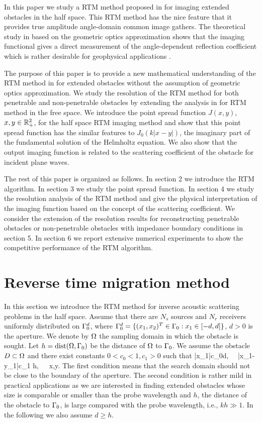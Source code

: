 \documentclass[11pt]{iopart}
\begin{document}
In this paper we study a RTM method proposed in \cite{zs09, zs07} for imaging extended obstacles in the half space. This RTM method has the nice feature that it provides true amplitude angle-domain common image gathers. The theoretical study in \cite{zs07} based on the geometric optics approximation shows that the imaging functional gives a direct measurement of the angle-dependent reflection coefficient which is rather desirable for geophysical applications \cite{bcs}.

The purpose of this paper is to provide a new mathematical understanding of the RTM method in \cite{zs09, zs07} for extended obstacles without the assumption of geometric optics approximation. We study the resolution of the RTM method for both penetrable and non-penetrable obstacles by extending the analysis in \cite{cch_a, cch_e} for RTM method in the free space. We introduce the point spread function $J(x,y)$, $x,y\in{\mathbb{R}}^2_+$, for the half space RTM imaging method and show that this point spread function has the similar features to $J_0(k|x-y|)$, the imaginary part of the fundamental solution of the Helmholtz equation. We also show that the output imaging function is related to the scattering coefficient of the obstacle for incident plane waves.

The rest of this paper is organized as follows. In section 2 we introduce the RTM algorithm. In section 3 we study the point spread function. In section 4 we study the resolution analysis of the RTM method and give the physical interpretation of the imaging function based on the concept of the scattering coefficient. We consider the extension of the resolution results for reconstructing penetrable
obstacles or non-penetrable obstacles with impedance boundary conditions in section 5.  In section 6 we report extensive numerical experiments to show the competitive performance of the RTM algorithm.

\section{Reverse time migration method}{\label{section2}}

In this section we introduce the RTM method for inverse acoustic scattering problems
in the half space. Assume that there are $N_s$ sources and $N_r$ receivers uniformly distributed on $\Gamma_0^d$, where $\Gamma_0^d=\{(x_1,x_2)^T\in\Gamma_0: x_1\in [-d,d]\}$, $d>0$ is the aperture. We denote by $\Omega$ the sampling domain in which the obstacle is sought. Let $h=\mathrm{dist}(\Omega,\Gamma_0)$ be the distance of $\Omega$ to $\Gamma_0$.
We assume the obstacle $D \subset\Omega$ and there exist constants $0<c_0<1, c_1>0$ such that
\bee\label{cond}
\qquad |x_1|\le c_0d, \ \ |x_1-y_1|\le c_1 h,\ \ \ \forall x,y\in\Om.
\eee
The first condition means that the search domain should not be close to the boundary of the aperture. The second condition is rather mild in practical applications as we are interested in finding extended obstacles
whose size is comparable or smaller than the probe wavelength and $h$, the distance of the obstacle to $\Gamma_0$, is large compared with the probe wavelength, i.e., $kh\gg 1$. In the following we also assume $d\ge h$.
\end{document}
